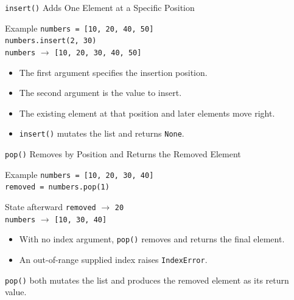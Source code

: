 \documentclass[aspectratio=169,10pt]{beamer}
\begin{document}
\begin{frame}{\texttt{insert()} Adds One Element at a Specific Position}
  \begin{block}{Example}
    \texttt{numbers = [10, 20, 40, 50]}\\
    \texttt{numbers.insert(2, 30)}\\[0.08in]
    \texttt{numbers} $\longrightarrow$ \texttt{[10, 20, 30, 40, 50]}
  \end{block}

  \begin{itemize}
    \item The first argument specifies the insertion position.
    \item The second argument is the value to insert.
    \item The existing element at that position and later elements move right.
    \item \texttt{insert()} mutates the list and returns \texttt{None}.
  \end{itemize}
\end{frame}




\begin{frame}{\texttt{pop()} Removes by Position and Returns the Removed Element}
  \begin{block}{Example}
    \texttt{numbers = [10, 20, 30, 40]}\\
    \texttt{removed = numbers.pop(1)}
  \end{block}

  \begin{block}{State afterward}
    \texttt{removed} $\longrightarrow$ \texttt{20}\\
    \texttt{numbers} $\longrightarrow$ \texttt{[10, 30, 40]}
  \end{block}

  \begin{itemize}
    \item With no index argument, \texttt{pop()} removes and returns the final element.
    \item An out-of-range supplied index raises \texttt{IndexError}.
  \end{itemize}
  \begin{keyidea}
    \texttt{pop()} both mutates the list and produces the removed element as its return value.
  \end{keyidea}
\end{frame}
\end{document}

